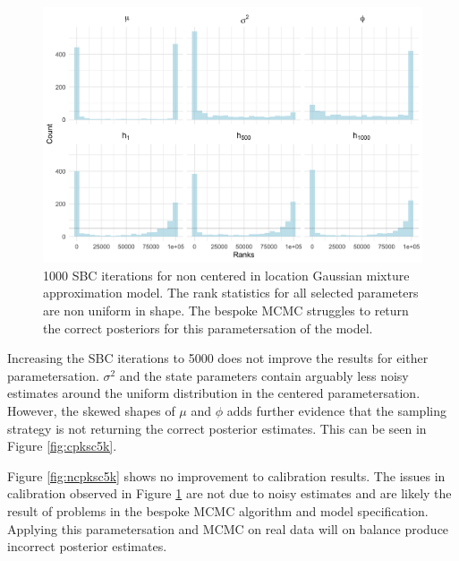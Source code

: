 \documentclass[12pt, a4paper]{article}
\begin{document}
    \begin{figure}[H]
        \centering
        \includegraphics[scale=0.1]{results/ksc_ncp_1k.png}
        \caption{1000 SBC iterations for non centered in location Gaussian mixture approximation model. The rank statistics for all selected parameters are non uniform in shape. The bespoke MCMC struggles to return the correct posteriors for this parametersation of the model.}
        \label{fig:ncpksc1k}
    \end{figure}

    Increasing the SBC iterations to 5000 does not improve the results for either parametersation. $\sigma^2$ and the state parameters contain arguably less noisy estimates around the uniform distribution in the centered parametersation. However, the skewed shapes of $\mu$ and $\phi$ adds further evidence that the sampling strategy is not returning the correct posterior estimates. This can be seen in Figure \ref{fig:cpksc5k}.

    Figure \ref{fig:ncpksc5k} shows no improvement to calibration results. The issues in calibration observed in Figure \ref{fig:ncpksc1k} are not due to noisy estimates and are likely the result of problems in the bespoke MCMC algorithm and model specification. Applying this parametersation and MCMC on real data will on balance produce incorrect posterior estimates. 
\end{document}
